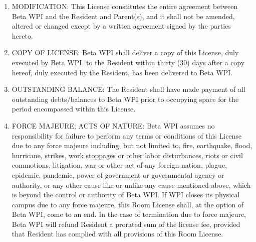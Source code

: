 \documentclass[legalpaper, 12pt]{article}
\begin{document}
\begin{enumerate}
\item\label{itm:mods}

MODIFICATION\@: This License constitutes the entire agreement between Beta WPI and the Resident and Parent(s), and it shall not be amended, altered or changed except by a written agreement signed by the parties hereto.

\item\label{itm:copy}

COPY OF LICENSE\@: Beta WPI shall deliver a copy of this License, duly executed by Beta WPI, to the Resident within thirty (30) days after a copy hereof, duly executed by the Resident, has been delivered to Beta WPI\@.

\item\label{itm:balance}

OUTSTANDING BALANCE\@: The Resident shall have made payment of all outstanding debts/balances to Beta WPI prior to occupying space for the period encompassed within this License.

\item\label{itm:forcemajeure}

FORCE MAJEURE; ACTS OF NATURE\@: Beta WPI assumes no responsibility for failure to perform any terms or conditions of this License due to any force majeure including, but not limited to, fire, earthquake, flood, hurricane, strikes, work stoppages or other labor disturbances, riots or civil commotions, litigation, war or other act of any foreign nation, plague, epidemic, pandemic, power of government or governmental agency or authority, or any other cause like or unlike any cause mentioned above, which is beyond the control or authority of Beta WPI\@.
If WPI closes its physical campus due to any force majeure, this Room License shall, at the option of Beta WPI, come to an end.
In the case of termination due to force majeure, Beta WPI will refund Resident a prorated sum of the license fee, provided that Resident has complied with all provisions of this Room License.

\end{enumerate}
\end{document}
